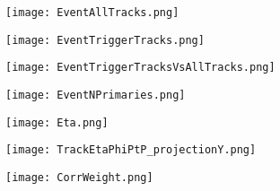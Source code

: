 \documentclass{beamer}
\begin{document}

\begin{frame}
 	\begin{figure}[h!]
	\centering
	\texttt{[image: EventAllTracks.png]}
	\end{figure}
\end{frame}

\begin{frame}
 	\begin{figure}[h!]
	\centering
	\texttt{[image: EventTriggerTracks.png]}
	\end{figure}
\end{frame}

\begin{frame}
  \begin{figure}[h!]
  \centering
  \texttt{[image: EventTriggerTracksVsAllTracks.png]}
  \end{figure}
\end{frame}

\begin{frame}
 	\begin{figure}[h!]
	\centering
	\texttt{[image: EventNPrimaries.png]}
	\end{figure}
\end{frame}

\begin{frame}
 	\begin{figure}[h!]
	\centering
	\texttt{[image: Eta.png]}
	\end{figure}
\end{frame}

\begin{frame}
  \begin{figure}[h!]
  \centering
  \texttt{[image: TrackEtaPhiPtP\_projectionY.png]}
  \end{figure}
\end{frame}

\begin{frame}
  \begin{figure}[h!]
  \centering
  \texttt{[image: CorrWeight.png]}
  \end{figure}
\end{frame}
\end{document}
